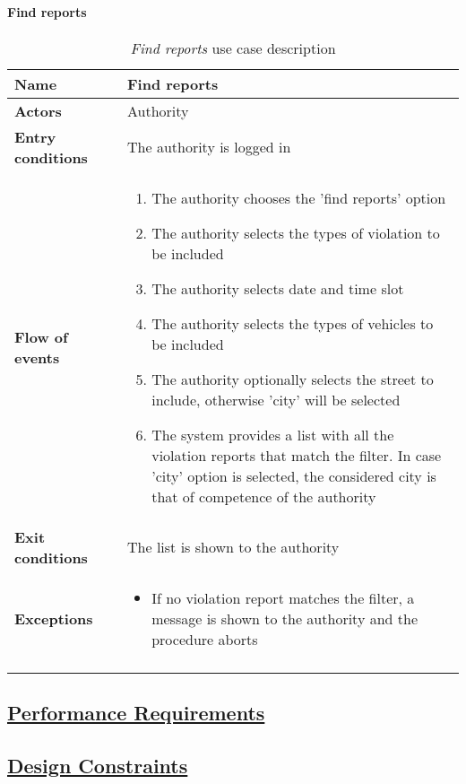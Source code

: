 	\paragraph{Find reports}
	\begin{longtable}{p{0.25\linewidth}p{0.75\linewidth}}
		\toprule
		\textbf{Name} & \textbf{Find reports} \\
		\midrule
		\textbf{Actors} & Authority\\
		\midrule
		\textbf{Entry conditions} & The authority is logged in \\
		\midrule
		\textbf{Flow of events} & 
		\begin{enumerate}
			\item The authority chooses the 'find reports' option
			\item The authority selects the types of violation to be included
			\item The authority selects date and time slot
			\item The authority selects the types of vehicles to be included
			\item The authority optionally selects the street to include, otherwise 'city' will be selected
			\item The system provides a list with all the violation reports that match the filter. In case 'city' option is selected, the considered city is that of competence of the authority
		\end{enumerate} \\
		\midrule
		\textbf{Exit conditions} & The list is shown to the authority\\
		\midrule
		\textbf{Exceptions} & 
		\begin{itemize}
			\item If no violation report matches the filter, a message is shown to the authority and the procedure aborts
		\end{itemize} \\
		\bottomrule
		\caption{\emph{Find reports} use case description}
	\end{longtable}
	
		
	
	
\subsection[Performance Requirements]{\hyperlink{toc}{Performance Requirements}}

\subsection[Design Constraints]{\hyperlink{toc}{Design Constraints}}
